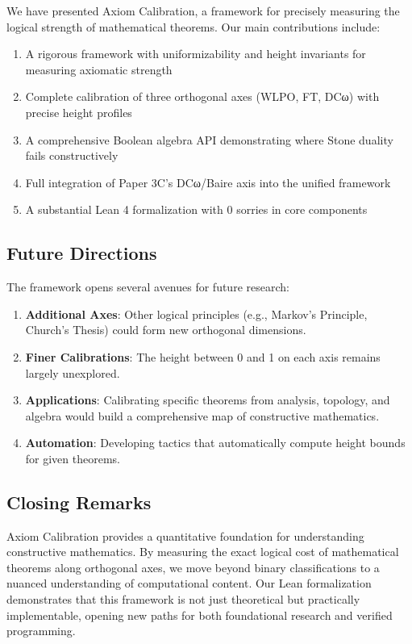 \documentclass[11pt]{article}
\theoremstyle{plain}
\theoremstyle{definition}
\begin{document}
We have presented Axiom Calibration, a framework for precisely measuring the logical strength of mathematical theorems. Our main contributions include:

\begin{enumerate}
\item A rigorous framework with uniformizability and height invariants for measuring axiomatic strength
\item Complete calibration of three orthogonal axes (WLPO, FT, DCω) with precise height profiles
\item A comprehensive Boolean algebra API demonstrating where Stone duality fails constructively
\item Full integration of Paper 3C's DCω/Baire axis into the unified framework
\item A substantial Lean 4 formalization with 0 sorries in core components
\end{enumerate}

\subsection{Future Directions}

The framework opens several avenues for future research:

\begin{enumerate}
\item \textbf{Additional Axes}: Other logical principles (e.g., Markov's Principle, Church's Thesis) could form new orthogonal dimensions.
\item \textbf{Finer Calibrations}: The height between 0 and 1 on each axis remains largely unexplored.
\item \textbf{Applications}: Calibrating specific theorems from analysis, topology, and algebra would build a comprehensive map of constructive mathematics.
\item \textbf{Automation}: Developing tactics that automatically compute height bounds for given theorems.
\end{enumerate}

\subsection{Closing Remarks}

Axiom Calibration provides a quantitative foundation for understanding constructive mathematics. By measuring the exact logical cost of mathematical theorems along orthogonal axes, we move beyond binary classifications to a nuanced understanding of computational content. Our Lean formalization demonstrates that this framework is not just theoretical but practically implementable, opening new paths for both foundational research and verified programming.
\end{document}
